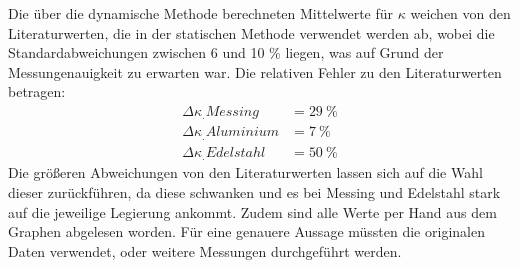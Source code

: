 Die über die dynamische Methode berechneten Mittelwerte für $\kappa$ weichen von den Literaturwerten, die in der statischen Methode verwendet werden ab, wobei die  Standardabweichungen zwischen 6 und 10 \% liegen, was auf Grund der Messungenauigkeit zu erwarten war. Die relativen Fehler zu den Literaturwerten betragen:
\begin{align*}
\Delta\kappa_.{Messing}		&=\SI{29}{\percent}\\
\Delta\kappa_.{Aluminium}	&=\SI{7}{\percent}\\
\Delta\kappa_.{Edelstahl}		&=\SI{50}{\percent}
\end{align*}
Die größeren Abweichungen von den Literaturwerten lassen sich auf die Wahl dieser zurückführen, da diese schwanken und es bei Messing und Edelstahl stark auf die jeweilige Legierung ankommt. Zudem sind alle Werte per Hand aus dem Graphen abgelesen worden. Für eine genauere Aussage müssten die originalen Daten verwendet, oder weitere Messungen durchgeführt werden.

